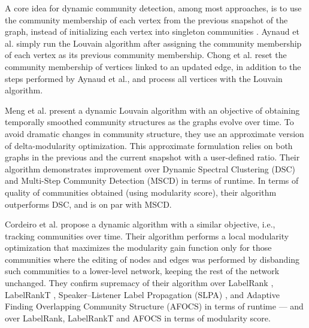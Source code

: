 A core idea for dynamic community detection, among most approaches, is to use the community membership of each vertex from the previous snapshot of the graph, instead of initializing each vertex into singleton communities \cite{com-aynaud10, com-chong13, com-cordeiro16, com-zarayeneh21}. Aynaud et al. \cite{com-aynaud10} simply run the Louvain algorithm after assigning the community membership of each vertex as its previous community membership. Chong et al. \cite{com-chong13} reset the community membership of vertices linked to an updated edge, in addition to the steps performed by Aynaud et al., and process all vertices with the Louvain algorithm.

Meng et al. \cite{com-meng16} present a dynamic Louvain algorithm with an objective of obtaining temporally smoothed community structures as the graphs evolve over time. To avoid dramatic changes in community structure, they use an approximate version of delta-modularity optimization. This approximate formulation relies on both graphs in the previous and the current snapshot with a user-defined ratio. Their algorithm demonstrates improvement over Dynamic Spectral Clustering (DSC) \cite{chi2009evolutionary} and Multi-Step Community Detection (MSCD) \cite{aynaud2011multi} in terms of runtime. In terms of quality of communities obtained (using modularity score), their algorithm outperforms DSC, and is on par with MSCD.

Cordeiro et al. \cite{com-cordeiro16} propose a dynamic algorithm with a similar objective, i.e., tracking communities over time. Their algorithm performs a local modularity optimization that maximizes the modularity gain function only for those communities where the editing of nodes and edges was performed by disbanding such communities to a lower-level network, keeping the rest of the network unchanged. They confirm supremacy of their algorithm over LabelRank \cite{xie2013labelrank}, LabelRankT \cite{com-xie13}, Speaker–Listener Label Propagation (SLPA) \cite{com-xie11}, and Adaptive Finding Overlapping Community Structure (AFOCS) \cite{nguyen2011overlapping} in terms of runtime --- and over LabelRank, LabelRankT and AFOCS in terms of modularity score.



